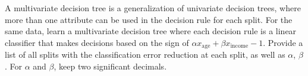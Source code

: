 \item {} A multivariate decision tree is a generalization of univariate decision trees, where more than one attribute can be used in the decision rule for each split. For the same data, learn a multivariate decision tree where each decision rule is a linear classifier that makes decisions based on the sign of $\alpha x_{\text{age}} +\beta x_{\text{income}} -1$. Provide a list of all splits with the classification error reduction at each split, as well as $\alpha$, $\beta$. For $\alpha$ and $\beta$, keep two significant decimals.